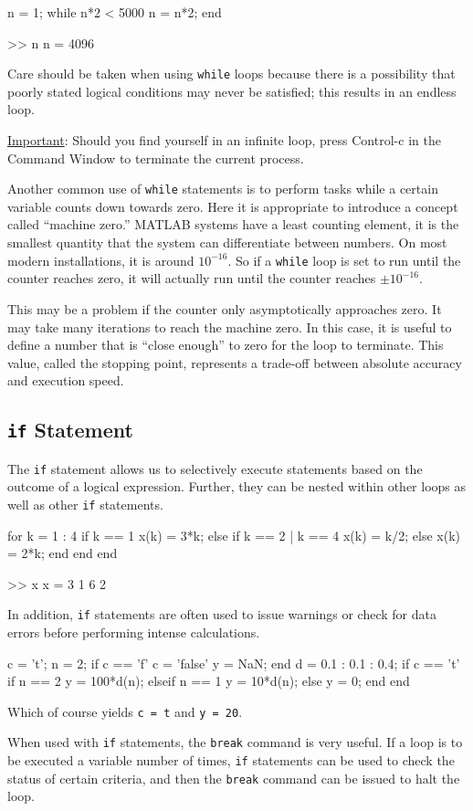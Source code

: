 \begin{codex}
n = 1;
while n*2 < 5000
    n = n*2;
end

>>  n
n =
    4096
\end{codex}
Care should be taken when using \verb=while= loops because there is a possibility that poorly stated logical conditions may never be satisfied; this results in an endless loop.\\[6pt]
\parbox{\textwidth}{\mbox{\large \uline{Important}:} Should you find yourself in an infinite loop, press Control-c in the Command Window to terminate the current process.}
\vspace{1pt}
\par
Another common use of \verb=while= statements is to perform tasks while a certain variable counts down towards zero.  Here it is appropriate to introduce a concept called ``machine zero.''  MATLAB systems have a least counting element, it is the smallest quantity that the system can differentiate between numbers.  On most modern installations, it is around $10^{-16}$.  So if a \verb=while= loop is set to run until the counter reaches zero, it will actually run until the counter reaches $\pm 10^{-16}$.
\par
This may be a problem if the counter only asymptotically approaches zero.  It may take many iterations to reach the machine zero.  In this case, it is useful to define a number that is ``close enough'' to zero for the loop to terminate. This value, called the stopping point, represents a trade-off between absolute accuracy and execution speed.

\subsection{\texttt{if} Statement}
The \verb=if= statement allows us to selectively execute statements based on the outcome of a logical expression.  Further, they can be nested within other loops as well as other \verb=if= statements.

\begin{codex}
for k = 1 : 4
    if k == 1
        x(k) = 3*k;
    else
        if k == 2 | k == 4
            x(k) = k/2;
        else
            x(k) = 2*k;
        end
    end
end

>>  x
x =
    3   1   6   2
\end{codex}
In addition, \verb=if= statements are often used to issue warnings or check for data errors before performing intense calculations.

\begin{codex}
c = 't'; n = 2;
if c == 'f'
    c = 'false'
    y = NaN;
end
d = 0.1 : 0.1 : 0.4;
if c == 't'
    if n == 2
        y = 100*d(n);
    elseif n == 1
        y = 10*d(n);
    else
        y = 0;
    end
end
\end{codex}
Which of course yields \verb#c = t# and \verb#y = 20#.
\par
When used with \verb=if= statements, the \verb=break= command is very useful.  If a loop is to be executed a variable number of times, \verb=if= statements can be used to check the status of certain criteria, and then the \verb=break= command can be issued to halt the loop.


